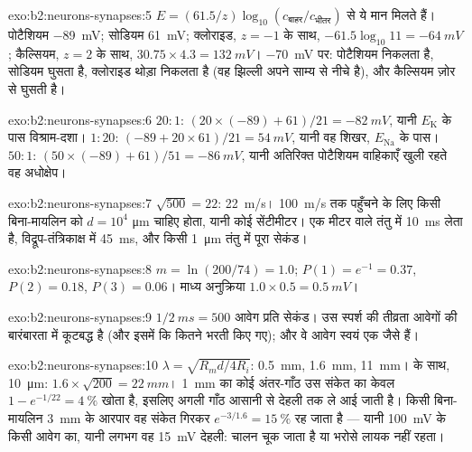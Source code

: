 \begin{solution}{exo:b2:neurons-synapses:5}
$E = (61.5/z)\log_{10}(c_{\text{बाहर}}/c_{\text{भीतर}})$ से ये मान
मिलते हैं। पोटैशियम \qty{-89}{mV}; सोडियम \qty{+61}{mV}; क्लोराइड, $z =
-1$ के साथ, $-61.5\log_{10} 11 = \qty{-64}{mV}$; कैल्सियम, $z = 2$ के साथ,
$30.75\times 4.3 = \qty{+132}{mV}$। \qty{-70}{mV} पर:
पोटैशियम निकलता है, सोडियम घुसता है, क्लोराइड थोड़ा निकलता है (वह
झिल्ली अपने साम्य से नीचे है), और कैल्सियम ज़ोर से घुसती है।
\end{solution}

\begin{solution}{exo:b2:neurons-synapses:6}
$20 : 1$: $(20\times(-89) + 61)/21 = \qty{-82}{mV}$, यानी $E_{\mathrm K}$ के पास
विश्राम-दशा। $1 : 20$: $(-89 + 20\times 61)/21 =
\qty{+54}{mV}$, यानी वह शिखर, $E_{\mathrm{Na}}$ के पास। $50 : 1$: $(50\times
(-89) + 61)/51 = \qty{-86}{mV}$, यानी अतिरिक्त पोटैशियम वाहिकाएँ खुली रहते
वह अधोक्षेप।
\end{solution}

\begin{solution}{exo:b2:neurons-synapses:7}
$\sqrt{500} = 22$: \qty{22}{m/s}। \qty{100}{m/s} तक पहुँचने के लिए किसी
बिना-मायलिन  को $d = 10^{4}$ \unit{\micro m} चाहिए होता, यानी कोई
सेंटीमीटर। एक मीटर  वाले तंतु में \qty{10}{ms} लेता है,
विद्रूप-तंत्रिकाक्ष में \qty{45}{ms}, और किसी \qty{1}{\micro m} तंतु में
पूरा सेकंड।
\end{solution}

\begin{solution}{exo:b2:neurons-synapses:8}
$m = \ln(200/74) = 1.0$; $P(1) = e^{-1} = 0.37$, $P(2) = 0.18$, $P(3)
= 0.06$। माध्य अनुक्रिया $1.0\times 0.5 = \qty{0.5}{mV}$।
\end{solution}

\begin{solution}{exo:b2:neurons-synapses:9}
$1/\qty{2}{ms} = 500$ आवेग प्रति सेकंड। उस स्पर्श की तीव्रता
आवेगों की बारंबारता में कूटबद्ध है (और इसमें कि कितने 
भरती किए गए); और वे आवेग स्वयं एक जैसे हैं।
\end{solution}

\begin{solution}{exo:b2:neurons-synapses:10}
$\lambda = \sqrt{R_m d/4R_i}$: \qty{0.5}{mm}, \qty{1.6}{mm},
\qty{11}{mm}।  के साथ, \qty{10}{\micro m}: $1.6\times\sqrt{200} =
\qty{22}{mm}$। \qty{1}{mm} का कोई अंतर-गाँठ उस संकेत का केवल $1 - e^{-1/22}
= \qty{4}{\%}$ खोता है, इसलिए अगली गाँठ आसानी से देहली तक
ले आई जाती है। किसी बिना-मायलिन \qty{3}{mm} के आरपार वह संकेत गिरकर
$e^{-3/1.6} = \qty{15}{\%}$ रह जाता है --- यानी \qty{100}{mV} के किसी आवेग का, यानी लगभग वह
\qty{15}{mV} देहली: चालन चूक जाता है या भरोसे लायक नहीं रहता।
\end{solution}

